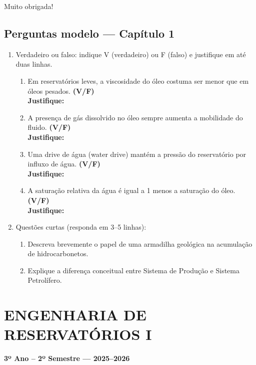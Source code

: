 \documentclass[11pt,a4paper]{article}
\begin{document}
Muito obrigada!

\subsection{Perguntas modelo — Capítulo 1}
\begin{enumerate}
\item Verdadeiro ou falso: indique V (verdadeiro) ou F (falso) e justifique em até duas linhas.
\begin{enumerate}[label=\alph*)]
\item Em reservatórios leves, a viscosidade do óleo costuma ser menor que em óleos pesados. \hfill \textbf{(V/F)}\\
\textbf{Justifique:} \vspace{1\baselineskip}
\item A presença de gás dissolvido no óleo sempre aumenta a mobilidade do fluido. \hfill \textbf{(V/F)}\\
\textbf{Justifique:} \vspace{1\baselineskip}
\item Uma drive de água (water drive) mantém a pressão do reservatório por influxo de água. \hfill \textbf{(V/F)}\\
\textbf{Justifique:} \vspace{1\baselineskip}
\item A saturação relativa da água é igual a 1 menos a saturação do óleo. \hfill \textbf{(V/F)}\\
\textbf{Justifique:} \vspace{1\baselineskip}
\end{enumerate}
\item Questões curtas (responda em 3–5 linhas):
\begin{enumerate}[label=\alph*)]
\item Descreva brevemente o papel de uma armadilha geológica na acumulação de hidrocarbonetos.
\item Explique a diferença conceitual entre Sistema de Produção e Sistema Petrolífero.
\end{enumerate}
\end{enumerate}




\section{ENGENHARIA DE RESERVATÓRIOS I}
\textbf{3º Ano – 2º Semestre — 2025–2026}
\end{document}
